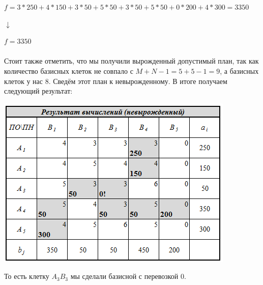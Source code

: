 \documentclass[14pt,a4paper,fleqn]{extarticle}
\begin{document}
\small $f = 3*250+4*150+3*50+5*50+3*50+5*50+0*200+4*300 = 3350$
\begin{center}
	$\downarrow$
\end{center}
$f = 3350$\\\\
Стоит также отметить, что мы получили вырожденный допустимый план, так как количество базисных клеток не совпало с $M+N-1 = 5+5-1 = 9$, а базисных клеток у нас 8.
\newpage
Сведём этот план к невырожденному. В итоге получаем следующий результат:\\
\begin{center}
	\includegraphics[scale=0.6]{33}
\end{center}
То есть клетку $A_3B_3$ мы сделали базисной с перевозкой 0.
\newpage
\end{document}
